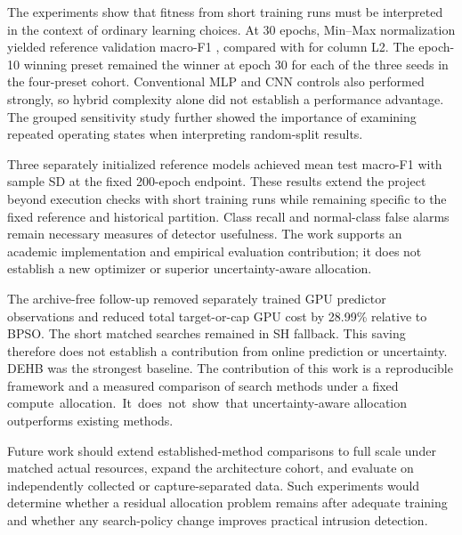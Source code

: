 \documentclass[11pt,a4paper]{report}
\begin{document}
The experiments show that fitness from short training runs must be interpreted in the context of ordinary learning choices. At 30 epochs, Min--Max normalization yielded reference validation macro-F1 \ExtMinmaxThirty{}, compared with \ExtColumnThirty{} for column L2. The epoch-10 winning preset remained the winner at epoch 30 for each of the three seeds in the four-preset cohort. Conventional MLP and CNN controls also performed strongly, so hybrid complexity alone did not establish a performance advantage. The grouped sensitivity study further showed the importance of examining repeated operating states when interpreting random-split results.

Three separately initialized reference models achieved mean test macro-F1 \FinalTestFOne{} with sample SD \FinalTestFOneSD{} at the fixed 200-epoch endpoint. These results extend the project beyond execution checks with short training runs while remaining specific to the fixed reference and historical partition. Class recall and normal-class false alarms remain necessary measures of detector usefulness. The work supports an academic implementation and empirical evaluation contribution; it does not establish a new optimizer or superior uncertainty-aware allocation.

The archive-free follow-up removed separately trained GPU predictor observations and reduced total target-or-cap GPU cost by 28.99\% relative to BPSO. The short matched searches remained in SH fallback. This saving therefore does not establish a contribution from online prediction or uncertainty. DEHB was the strongest baseline. The contribution of this work is a reproducible framework and a measured comparison of search methods under a fixed \mbox{compute allocation. It does not show that} uncertainty-aware allocation outperforms existing methods.




Future work should extend established-method comparisons to full scale under matched actual resources, expand the architecture cohort, and evaluate on independently collected or capture-separated data. Such experiments would determine whether a residual allocation problem remains after adequate training and whether any search-policy change improves practical intrusion detection.

\appendix
\end{document}
